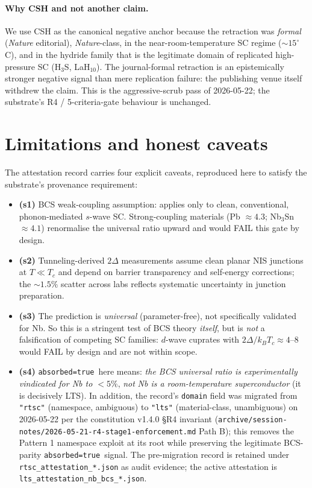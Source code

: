 \documentclass[11pt,a4paper]{article}
\newcommand{\absorbedtrue}{\textcolor{honestgreen}{\texttt{absorbed=true}}}
\begin{document}
\paragraph{Why CSH and not another claim.}
We use CSH as the canonical negative anchor because the retraction
was \emph{formal} (\emph{Nature} editorial), \emph{Nature}-class, in
the near-room-temperature SC regime ($\sim 15^{\circ}$C), and in the
hydride family that is the legitimate domain of replicated
high-pressure SC (H$_3$S, LaH$_{10}$). The journal-formal retraction
is an epistemically stronger negative signal than mere replication
failure: the publishing venue itself withdrew the claim. This is the
aggressive-scrub pass of 2026-05-22; the substrate's R4 /
5-criteria-gate behaviour is unchanged.

\section{Limitations and honest caveats}
\label{sec:limits}

The attestation record carries four explicit caveats, reproduced here
to satisfy the substrate's provenance requirement:

\begin{itemize}\itemsep0.3em
\item \textbf{(s1)} BCS weak-coupling assumption: applies only to clean,
  conventional, phonon-mediated $s$-wave SC. Strong-coupling materials
  (Pb \(\approx 4.3\); Nb$_{3}$Sn \(\approx 4.1\)) renormalise the
  universal ratio upward and would FAIL this gate by design.
\item \textbf{(s2)} Tunneling-derived \(2\Delta\) measurements assume
  clean planar NIS junctions at \(T \ll T_{c}\) and depend on barrier
  transparency and self-energy corrections; the \(\sim 1.5\%\) scatter
  across labs reflects systematic uncertainty in junction preparation.
\item \textbf{(s3)} The prediction is \emph{universal} (parameter-free),
  not specifically validated for Nb. So this is a stringent test of
  BCS theory \emph{itself}, but is \emph{not} a falsification of
  competing SC families: $d$-wave cuprates with \(2\Delta/k_{B}T_{c}
  \approx 4\text{--}8\) would FAIL by design and are not within scope.
\item \textbf{(s4)} \absorbedtrue\ here means: \emph{the BCS universal
  ratio is experimentally vindicated for Nb to \(<5\%\)}, \emph{not}
  \emph{Nb is a room-temperature superconductor} (it is decisively LTS).
  In addition, the record's \texttt{domain} field was migrated from
  \texttt{"rtsc"} (namespace, ambiguous) to \texttt{"lts"} (material-class,
  unambiguous) on 2026-05-22 per the constitution v1.4.0 \S R4 invariant
  (\texttt{archive/session-notes/2026-05-21-r4-stage1-enforcement.md} Path B);
  this removes the Pattern 1 namespace exploit at its root while
  preserving the legitimate BCS-parity \absorbedtrue\ signal. The
  pre-migration record is retained under \texttt{rtsc\_attestation\_*.json}
  as audit evidence; the active attestation is
  \texttt{lts\_attestation\_nb\_bcs\_*.json}.
\end{itemize}
\end{document}
